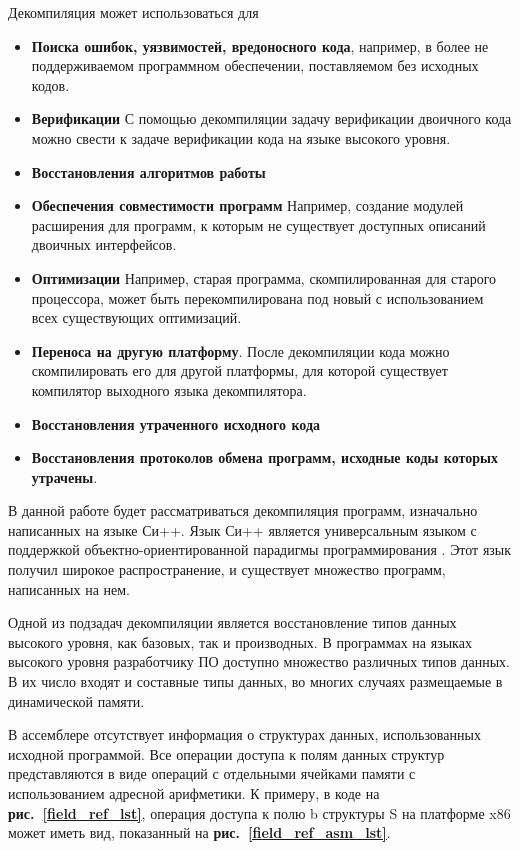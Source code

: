 \documentclass[a4paper,12pt,russian]{article}
\newcommand{\picref}[1]{\textbf{рис.~\ref{#1}}}
\newcommand{\code}[1]{\textsf{#1}}
\begin{document}
Декомпиляция может использоваться для
\begin{itemize}
\item{\textbf{Поиска ошибок, уязвимостей, вредоносного кода}}, например, в более не поддерживаемом программном обеспечении, поставляемом без исходных кодов.
\item{\textbf{Верификации}} С помощью декомпиляции задачу верификации двоичного кода можно свести к задаче верификации кода на языке высокого уровня.
\item{\textbf{Восстановления алгоритмов работы}}
\item{\textbf{Обеспечения совместимости программ}} Например, создание модулей расширения для программ, к которым не существует доступных описаний двоичных интерфейсов.
\item{\textbf{Оптимизации}} Например, старая программа, скомпилированная для старого процессора, может быть перекомпилирована под новый с использованием всех существующих оптимизаций.
\item{\textbf{Переноса на другую платформу}}. После декомпиляции кода можно скомпилировать его для другой платформы, для которой существует компилятор выходного языка декомпилятора.
\item{\textbf{Восстановления утраченного исходного кода}}
\item{\textbf{Восстановления протоколов обмена программ, исходные коды которых утрачены}}.
\end{itemize}

В данной работе будет рассматриваться декомпиляция программ, изначально написанных на языке Си++.
Язык Си++ является универсальным языком с поддержкой объектно-ориентированной парадигмы программирования \cite{strstr}. Этот язык получил широкое распространение, и существует множество программ, написанных на нем.

Одной из подзадач декомпиляции является восстановление типов данных высокого уровня, как базовых, так и производных.
В программах на языках высокого уровня разработчику ПО доступно множество различных типов данных.
В их число входят и составные типы данных, во многих случаях размещаемые в динамической памяти.

В ассемблере отсутствует информация о структурах данных, использованных исходной программой.
Все операции доступа к полям данных структур представляются в виде операций с отдельными ячейками памяти с использованием адресной арифметики.
К примеру, в коде на \picref{field_ref_lst}, операция доступа к полю \code{b} структуры \code{S} на платформе \code{x86} может иметь вид, показанный на \picref{field_ref_asm_lst}.
\end{document}
